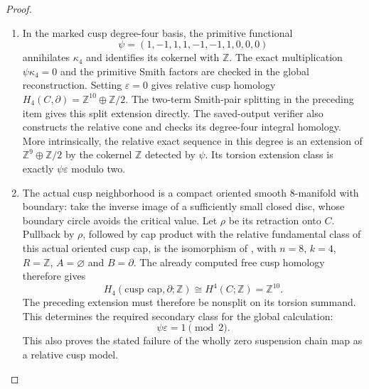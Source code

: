 \begin{proof}
\begin{enumerate}[label=\arabic*.]
\item In the marked cusp degree-four basis, the primitive functional
\[
 \psi=(1,-1,1,1,-1,-1,1,0,0,0)
\tag{1.19.3}
\]
annihilates $\kappa_4$ and identifies its cokernel with $\mathbb Z$.
The exact multiplication $\psi\kappa_4=0$ and the primitive Smith
factors are checked in the global reconstruction.  Setting
$\varepsilon=0$ gives relative cusp homology
$H_4(C,\partial)=\mathbb Z^{10}\oplus\mathbb Z/2$.
The two-term Smith-pair splitting in the preceding item gives this
split extension directly.  The saved-output verifier also constructs
the relative cone and checks its degree-four integral homology.
More intrinsically, the relative exact sequence in this degree is
an extension of $\mathbb Z^9\oplus\mathbb Z/2$ by the cokernel
$\mathbb Z$ detected by $\psi$.  Its torsion extension class is
exactly $\psi\varepsilon$ modulo two.

\item The actual cusp neighborhood is a compact oriented smooth
8-manifold with boundary: take the inverse image of a sufficiently
small closed disc, whose boundary circle avoids the critical value.
Let $\rho$ be its retraction onto $C$.  Pullback by $\rho$, followed
by cap product with the relative fundamental class of this actual
oriented cusp cap, is the isomorphism of
\cite[Theorem~3.43, p.~254]{Hatcher2002}, with $n=8$, $k=4$,
$R=\mathbb Z$, $A=\varnothing$ and $B=\partial$.
The already computed free cusp homology therefore gives
\[
 H_4(\text{cusp cap},\partial;\mathbb Z)
       \cong H^4(C;\mathbb Z)=\mathbb Z^{10}.
\]
The preceding extension must therefore be nonsplit on its torsion
summand.  This determines the required secondary class for the global
calculation:
\[
                 \psi\varepsilon=1\pmod2.
\tag{1.19.4}
\]
This also proves the stated failure of the wholly zero suspension
chain map as a relative cusp model.


\end{enumerate}
\end{proof}
